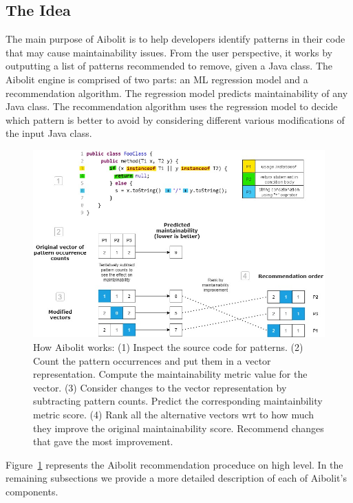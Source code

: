 \subsection{The Idea}

The main purpose of Aibolit is to help developers identify  patterns in their
code that may cause maintainability issues. From the user perspective, it works
by outputting a list of patterns recommended to remove, given a Java class. The
Aibolit engine is comprised of two parts: an ML regression model and a
recommendation algorithm. The regression model  predicts maintainability of any
Java class. The recommendation algorithm uses the regression model to decide
which pattern is better to avoid by considering different various modifications
of the input Java class. 

\begin{figure}[t]
\includegraphics[width=13cm]{how_it_works_diagram_5.jpg}
\centering
\vspace{1 cm}
\caption{How Aibolit works: (1) Inspect the source code for patterns. 
(2) Count the pattern occurrences and put them in a vector representation. 
Compute the maintainability metric value for the vector.
(3) Consider changes to the vector representation by subtracting pattern counts. 
Predict the corresponding maintainbility metric score.
(4) Rank all the alternative vectors wrt to how much they improve the original 
maintainability score. Recommend changes that gave the most improvement.}
\label{fig:aibolit_graphic}
\end{figure}

Figure~\ref{fig:aibolit_graphic} represents the Aibolit recommendation proceduce on high level.
In the remaining subsections we provide a more detailed
description of each of Aibolit's components.

